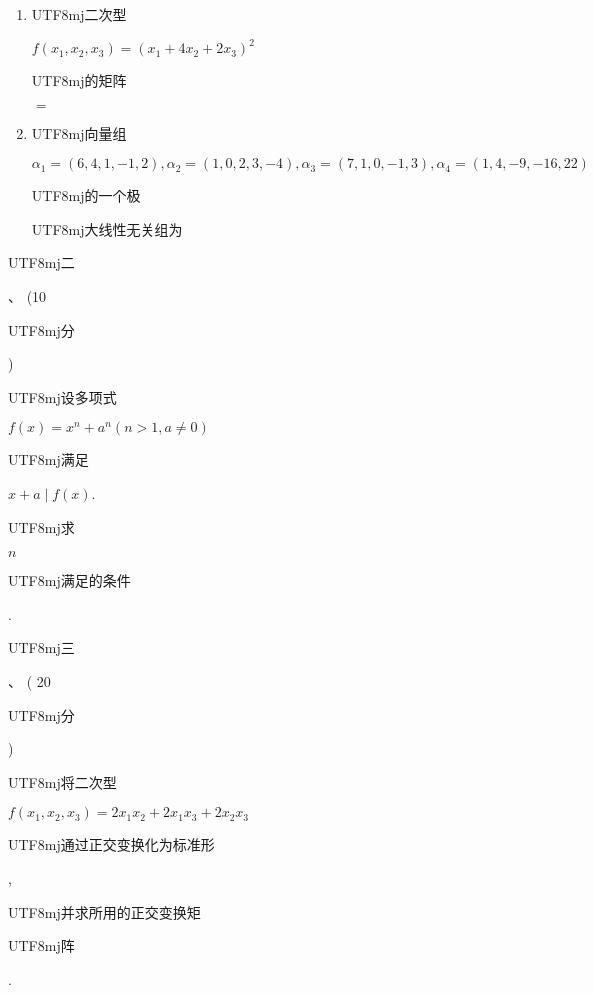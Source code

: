 \documentclass[10pt]{article}
\begin{document}
\begin{enumerate}
  \item \begin{CJK}{UTF8}{mj}二次型\end{CJK} $f\left(x_{1}, x_{2}, x_{3}\right)=\left(x_{1}+4 x_{2}+2 x_{3}\right)^{2}$ \begin{CJK}{UTF8}{mj}的矩阵\end{CJK} $=$

  \item \begin{CJK}{UTF8}{mj}向量组\end{CJK} $\alpha_{1}=(6,4,1,-1,2), \alpha_{2}=(1,0,2,3,-4), \alpha_{3}=(7,1,0,-1,3), \alpha_{4}=(1,4,-9,-16,22)$ \begin{CJK}{UTF8}{mj}的一个极\end{CJK} \begin{CJK}{UTF8}{mj}大线性无关组为\end{CJK}

\end{enumerate}
\begin{CJK}{UTF8}{mj}二\end{CJK}、 (10 \begin{CJK}{UTF8}{mj}分\end{CJK}) \begin{CJK}{UTF8}{mj}设多项式\end{CJK} $f(x)=x^{n}+a^{n}(n>1, a \neq 0)$ \begin{CJK}{UTF8}{mj}满足\end{CJK} $x+a \mid f(x)$. \begin{CJK}{UTF8}{mj}求\end{CJK} $n$ \begin{CJK}{UTF8}{mj}满足的条件\end{CJK}.

\begin{CJK}{UTF8}{mj}三\end{CJK}、 ( 20 \begin{CJK}{UTF8}{mj}分\end{CJK}) \begin{CJK}{UTF8}{mj}将二次型\end{CJK} $f\left(x_{1}, x_{2}, x_{3}\right)=2 x_{1} x_{2}+2 x_{1} x_{3}+2 x_{2} x_{3}$ \begin{CJK}{UTF8}{mj}通过正交变换化为标准形\end{CJK}, \begin{CJK}{UTF8}{mj}并求所用的正交变换矩\end{CJK} \begin{CJK}{UTF8}{mj}阵\end{CJK}.
\end{document}
